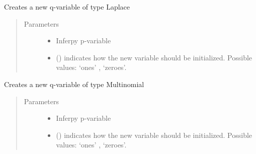 \documentclass[letterpaper,10pt,english]{sphinxmanual}
\begin{document}
\begin{fulllineitems}
\begin{fulllineitems}
\end{fulllineitems}


\begin{fulllineitems}
\label{\detokenize{modules/inferpy.inferences:inferpy.inferences.qmodel.Qmodel.Laplace}}
Creates a new q-variable of type Laplace
\begin{quote}\begin{description}
\item[{Parameters}] \leavevmode\begin{itemize}
\item {} 
 \textendash{} Inferpy p-variable

\item {} 
 () \textendash{} indicates how the new variable should be initialized. Possible values: ‘ones’ , ‘zeroes’.

\end{itemize}

\end{description}\end{quote}

\end{fulllineitems}


\begin{fulllineitems}
\label{\detokenize{modules/inferpy.inferences:inferpy.inferences.qmodel.Qmodel.Multinomial}}
Creates a new q-variable of type Multinomial
\begin{quote}\begin{description}
\item[{Parameters}] \leavevmode\begin{itemize}
\item {} 
 \textendash{} Inferpy p-variable

\item {} 
 () \textendash{} indicates how the new variable should be initialized. Possible values: ‘ones’ , ‘zeroes’.


\end{itemize}
\end{description}
\end{quote}
\end{fulllineitems}
\end{fulllineitems}
\end{document}
